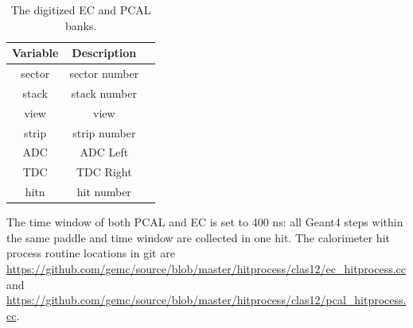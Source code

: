 \begin{table}[h]
	\begin{center}
		\begin{tabular}{| c | c | c |}
			\hline \hline
			Variable & Description                                         \\
			\hline
             sector  &                                     sector number   \\
              stack  &                                      stack number   \\
               view  &                                              view   \\
              strip  &                                      strip number   \\
                ADC  &                                          ADC Left   \\
                TDC  &                                         TDC Right   \\
               hitn  &                                        hit number   \\
			\hline \hline
		\end{tabular}
	\end{center}
	\caption{The digitized EC and PCAL banks.}\label{tab:ecBank}
\end{table}


The time window of both PCAL and EC is set to 400 ns: all Geant4 steps within the same paddle and time window are collected in one hit.
The calorimeter hit process routine locations in git are \url{https://github.com/gemc/source/blob/master/hitprocess/clas12/ec_hitprocess.cc} and
\url{https://github.com/gemc/source/blob/master/hitprocess/clas12/pcal_hitprocess.cc}.

